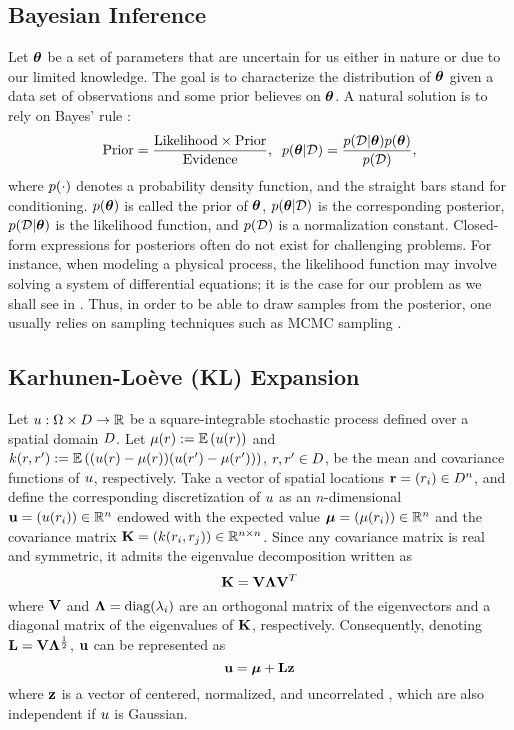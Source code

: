 \subsection{Bayesian Inference} 
Let ${\boldsymbol\theta}$ be a set of parameters that are uncertain for us either in nature or due to our limited knowledge. The goal is to characterize the distribution of ${\boldsymbol\theta}$ given a data set of observations and some prior believes on ${\boldsymbol\theta}$. A natural solution is to rely on Bayes' rule \cite{gelman2004}:
\begin{equation} \elabel{bayes}
  \text{Prior} = \frac{\text{Likelihood} \times \text{Prior}}{\text{Evidence}}, \;\; \f{\vparam | \Data} = \frac{\f{\Data | \vparam} \f{\vparam}}{\f{\Data}},
\end{equation}
where $\f{\cdot}$ denotes a probability density function, and the straight bars stand for conditioning. $\f{\vparam}$ is called the prior of ${\boldsymbol\theta}$, $\f{\vparam | \Data}$ is the corresponding posterior, $\f{\Data | \vparam}$ is the likelihood function, and $\f{\Data}$ is a normalization constant. Closed-form expressions for posteriors often do not exist for challenging problems. For instance, when modeling a physical process, the likelihood function may involve solving a system of differential equations; it is the case for our problem as we shall see in . Thus, in order to be able to draw samples from the posterior, one usually relies on sampling techniques such as MCMC sampling \cite{gelman2004}.

\subsection{Karhunen-Lo\`{e}ve (KL) Expansion} 
Let $u: \Omega \times D \to \mathbb{R}$ be a square-integrable stochastic process defined over a spatial domain $D$. Let $\fMean{\r} := \E{\u(\r)}$ and $\fCov{\r, \r'} := \E{(\u(\r) - \fMean{\r}) (\u(\r') - \fMean{\r'})}$, $r, r' \in D$, be the mean and covariance functions of $u$, respectively. Take a vector of spatial locations $\mathbf{r} = (r_i) \in D^n$, and define the corresponding discretization of $u$ as an $n$-dimensional \rv\ $\mathbf{u} = (u(r_i)) \in \mathbb{R}^n$ endowed with the expected value $\vmean = (\fMean{\r_i}) \in \real^n$ and the covariance matrix $\mCov = (\fCov{\r_i, \r_j}) \in \real^{n \times n}$. Since any covariance matrix is real and symmetric, it admits the eigenvalue decomposition \cite{press2007} written as
\[
  \mathbf{K} = \mathbf{V} \mathbf{\Lambda} \mathbf{V}^T
\]
where $\mathbf{V}$ and $\mathbf{\Lambda} = \text{diag}(\lambda_i)$ are an orthogonal matrix of the eigenvectors and a diagonal matrix of the eigenvalues of $\mathbf{K}$, respectively. Consequently, denoting $\mathbf{L} = \mathbf{V} \mathbf{\Lambda}^\frac{1}{2}$, $\mathbf{u}$ can be represented as
\begin{equation} \elabel{kl-expansion}
  \vu = \vmean + \mKL \vz
\end{equation}
where $\mathbf{z}$ is a vector of centered, normalized, and uncorrelated \rvs, which are also independent if $u$ is Gaussian.

